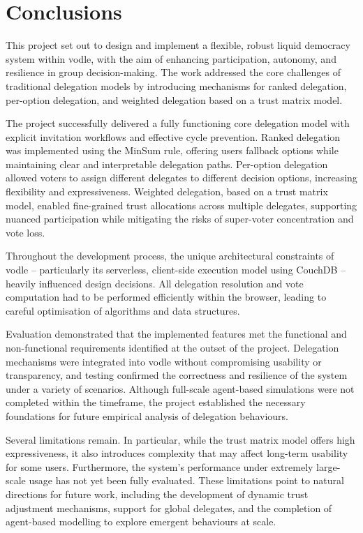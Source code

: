 \chapter{Conclusions}\label{ch:conclusions}
This project set out to design and implement a flexible, robust liquid democracy system within vodle, with the aim of enhancing participation, autonomy, and resilience in group decision-making. The work addressed the core challenges of traditional delegation models by introducing mechanisms for ranked delegation, per-option delegation, and weighted delegation based on a trust matrix model.

The project successfully delivered a fully functioning core delegation model with explicit invitation workflows and effective cycle prevention. Ranked delegation was implemented using the MinSum rule, offering users fallback options while maintaining clear and interpretable delegation paths. Per-option delegation allowed voters to assign different delegates to different decision options, increasing flexibility and expressiveness. Weighted delegation, based on a trust matrix model, enabled fine-grained trust allocations across multiple delegates, supporting nuanced participation while mitigating the risks of super-voter concentration and vote loss.

Throughout the development process, the unique architectural constraints of vodle -- particularly its serverless, client-side execution model using CouchDB -- heavily influenced design decisions. All delegation resolution and vote computation had to be performed efficiently within the browser, leading to careful optimisation of algorithms and data structures.

Evaluation demonstrated that the implemented features met the functional and non-functional requirements identified at the outset of the project. Delegation mechanisms were integrated into vodle without compromising usability or transparency, and testing confirmed the correctness and resilience of the system under a variety of scenarios. Although full-scale agent-based simulations were not completed within the timeframe, the project established the necessary foundations for future empirical analysis of delegation behaviours.

Several limitations remain. In particular, while the trust matrix model offers high expressiveness, it also introduces complexity that may affect long-term usability for some users. Furthermore, the system's performance under extremely large-scale usage has not yet been fully evaluated. These limitations point to natural directions for future work, including the development of dynamic trust adjustment mechanisms, support for global delegates, and the completion of agent-based modelling to explore emergent behaviours at scale.


